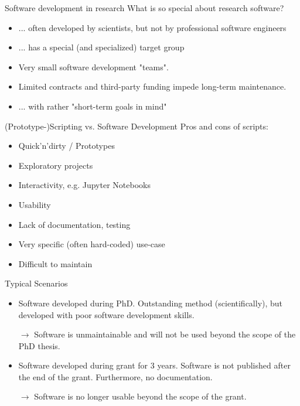 \documentclass[aspectratio=169,graphics,handout]{beamer}
\newcommand{\proarg}{\item[\textbf{+}]}
\newcommand{\contraarg}{\item[\textbf{-}]}
\begin{document}
\begin{frame}{Software development in research}
    What is so special about research software?

    \begin{itemize}
        \item ... often developed by scientists, but not by professional software engineers
        \item ... has a special (and specialized) target group
        \item Very small software development "teams".
        \item Limited contracts and third-party funding impede long-term maintenance.
    \item ... with rather "short-term goals in mind" %
\end{itemize}
\end{frame}

\begin{frame}{(Prototype-)Scripting vs. Software Development}
    Pros and cons of scripts:
    \begin{itemize}
        \proarg Quick'n'dirty / Prototypes
        \proarg Exploratory projects
        \proarg Interactivity, e.g. Jupyter Notebooks
        \pause
        \contraarg Usability
        \contraarg Lack of documentation, testing
        \contraarg Very specific (often hard-coded) use-case
        \contraarg Difficult to maintain
\end{itemize}

\end{frame}

\begin{frame}{Typical Scenarios}
    \begin{itemize}
        \item Software developed during PhD. Outstanding method (scientifically), but developed with poor software development skills.
        \item[$\rightarrow$] Software is unmaintainable and will not be used beyond the scope of the PhD thesis.

            \pause

        \item Software developed during grant for 3 years. Software is not published after the end of the grant. Furthermore, no documentation.
        \item[$\rightarrow$] Software is no longer usable beyond the scope of the grant.
    \end{itemize}

\end{frame}
\end{document}
